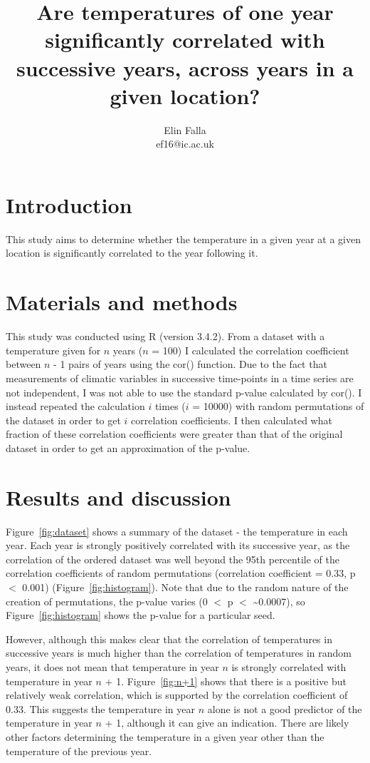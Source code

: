 \documentclass[12pt]{article}
\title{Are temperatures of one year significantly correlated with successive years, across years in a given location?}
\author{Elin Falla\\ef16@ic.ac.uk}
\date{} %
\begin{document}
	\maketitle
	
	\section{Introduction}
		This study aims to determine whether the temperature in a given year at a given location is significantly correlated to the year following it.
		
	\section{Materials and methods}
		This study was conducted using R (version 3.4.2). From a dataset with a temperature given for $n$ years ($n$ = 100) I calculated the correlation coefficient between $n$ - 1 pairs of years using the cor() function. Due to the fact that measurements of climatic variables in successive time-points in a time series are not independent, I was not able to use the standard p-value calculated by cor(). I instead repeated the calculation $i$ times ($i$ = 10000) with random permutations of the dataset in order to get $i$ correlation coefficients. I then calculated what fraction of these correlation coefficients were greater than that of the original dataset in order to get an approximation of the p-value.

	\section{Results and discussion}
		Figure~\ref{fig:dataset} shows a summary of the dataset - the temperature in each year. Each year is strongly positively correlated with its successive year, as the correlation of the ordered dataset was well beyond the 95th percentile of the correlation coefficients of random permutations (correlation coefficient = 0.33, p $<$ 0.001) (Figure~\ref{fig:histogram}). Note that due to the random nature of the creation of permutations, the p-value varies (0 $<$ p $<$ \textasciitilde 0.0007), so Figure~\ref{fig:histogram} shows the p-value for a particular seed.
		
		However, although this makes clear that the correlation of temperatures in successive years is much higher than the correlation of temperatures in random years, it does not mean that temperature in year $n$ is strongly correlated with temperature in year $n$ + 1. Figure~\ref{fig:n+1} shows that there is a positive but relatively weak correlation, which is supported by the correlation coefficient of 0.33. This suggests the temperature in year $n$ alone is not a good predictor of the temperature in year $n$ + 1, although it can give an indication. There are likely other factors determining the temperature in a given year other than the temperature of the previous year.
		
\end{document}
